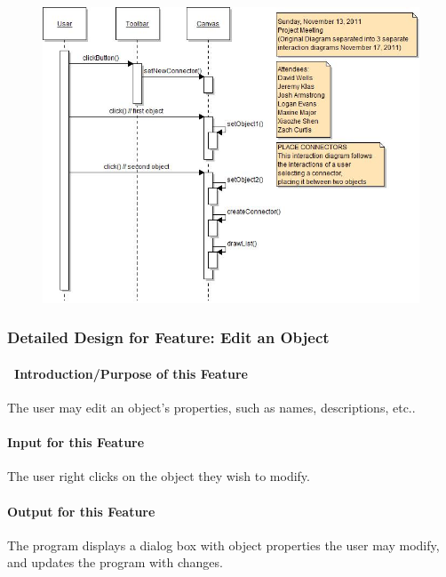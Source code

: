 \documentclass[twoside,letterpaper]{article}
\begin{document}
{\begin{figure}[h]
\centering
\includegraphics[width=5.0in]{IntNewConn.jpg}
\end{figure}

\clearpage

\subsubsection{Detailed Design for Feature: Edit an Object}

\paragraph[\ Introduction/Purpose of this Feature]
{\ Introduction/Purpose of this Feature}
{\color{black}
The user may edit an object{\textquoteright}s properties, such as names, descriptions, etc..
}

\paragraph[Input for this Feature]{Input for this Feature}
{\color{black}
The user right clicks on the object they wish to modify.
}

\paragraph{Output for this Feature}
{\color{black}
The program displays a dialog box with object properties the user may modify, and updates the program with changes.
}

}
\end{document}
